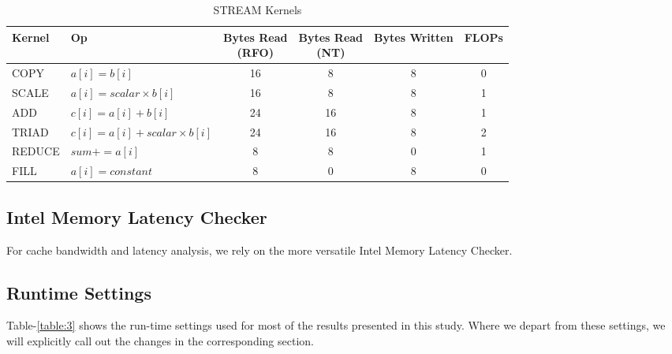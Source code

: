 \documentclass{article}
\begin{document}
\begin{table}[h!]
\centering
 \begin{tabular}{|l|l|c|c|c|c|}
 \hline
 Kernel & Op & \makecell{Bytes Read \\ (RFO)} & \makecell{Bytes Read \\ (NT)} & Bytes Written & FLOPs \\ \hline
 COPY & \(a[i] = b[i]\)& 16 & 8 & 8 & 0\\ \hline
 SCALE & \(a[i] = scalar \times b[i]\) & 16 & 8 & 8 & 1\\ \hline
 ADD & \(c[i] = a[i] + b[i]\) & 24 & 16 & 8 & 1\\ \hline
 TRIAD & \(c[i] = a[i] + scalar \times b[i]\) & 24 & 16 & 8 & 2 \\ \hline
 REDUCE & \(sum += a[i]\) & 8 & 8 & 0 & 1 \\ \hline
 FILL & \(a[i] = constant\) & 8 & 0 & 8 & 0 \\  \hline
\end{tabular}
\caption{STREAM Kernels}
\label{table:2}
\end{table}

\subsection{Intel Memory Latency Checker}For cache bandwidth and latency analysis, we rely on the more versatile Intel Memory Latency Checker.


\subsection{Runtime Settings}
Table-\ref{table:3} shows the run-time settings used for most of the results presented in this study. Where we depart from these settings, we will explicitly call out the changes in the corresponding section.
\end{document}
